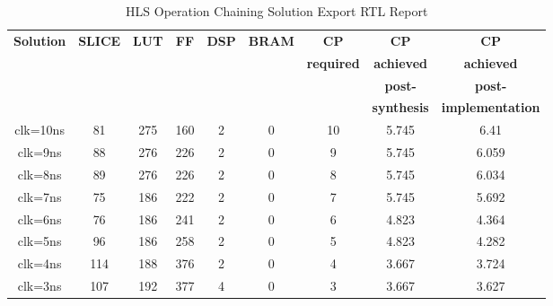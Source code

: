 \begin{table}[H]
    \centering
    \begin{tabular}{|c|c|c|c|c|c|c|c|c|}
        \hline
        \textbf{Solution} & \textbf{SLICE} & \textbf{LUT} & \textbf{FF} & \textbf{DSP} & \textbf{BRAM} & \textbf{CP} & \textbf{CP} & \textbf{CP} \\
        & & & & & & \textbf{required} & \textbf{achieved} & \textbf{achieved}\\
        & & & & & & & \textbf{post-} & \textbf{post-}\\
        & & & & & & & \textbf{synthesis} & \textbf{implementation}\\
        \hline
        clk=10ns & 81 & 275 & 160 & 2 & 0 & 10 & 5.745 & 6.41 \\
        \hline
        clk=9ns & 88 & 276 & 226 & 2 & 0 & 9 & 5.745 & 6.059 \\
        \hline
        clk=8ns & 89 & 276 & 226 & 2 & 0 & 8 & 5.745 & 6.034 \\
        \hline
        clk=7ns & 75 & 186 & 222 & 2 & 0 & 7 & 5.745 & 5.692 \\
        \hline
        clk=6ns & 76 & 186 & 241 & 2 & 0 & 6 & 4.823 & 4.364 \\
        \hline
        clk=5ns & 96 & 186 & 258 & 2 & 0 & 5 & 4.823 & 4.282 \\
        \hline
        clk=4ns & 114 & 188 & 376 & 2 & 0 & 4 & 3.667 & 3.724 \\
        \hline
        clk=3ns & 107 & 192 & 377 & 4 & 0 & 3 & 3.667 & 3.627 \\
        \hline
    \end{tabular}
    \caption{HLS Operation Chaining Solution Export RTL Report}
    \label{tab:vivado-operation-chaining-solution-export-rtl-report}
\end{table}

